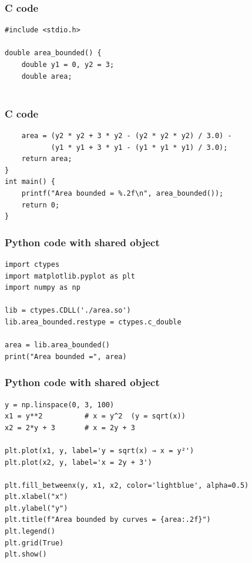 \documentclass{beamer}
\begin{document}
\begin{frame}[fragile]
\frametitle{C code}
\begin{lstlisting}
#include <stdio.h>

double area_bounded() {
    double y1 = 0, y2 = 3;
    double area;


\end{lstlisting}
\end{frame}
\begin{frame}[fragile]
\frametitle{C code}
\begin{lstlisting}
    area = (y2 * y2 + 3 * y2 - (y2 * y2 * y2) / 3.0) -
           (y1 * y1 + 3 * y1 - (y1 * y1 * y1) / 3.0);
    return area;
}
int main() {
    printf("Area bounded = %.2f\n", area_bounded());
    return 0;
}
\end{lstlisting}
\end{frame}
\begin{frame}[fragile]
\frametitle{Python code with shared object}
\begin{lstlisting}
import ctypes
import matplotlib.pyplot as plt
import numpy as np

lib = ctypes.CDLL('./area.so')
lib.area_bounded.restype = ctypes.c_double

area = lib.area_bounded()
print("Area bounded =", area)

\end{lstlisting}
\end{frame}
\begin{frame}[fragile]
\frametitle{Python code with shared object}
\begin{lstlisting}
y = np.linspace(0, 3, 100)
x1 = y**2          # x = y^2  (y = sqrt(x))
x2 = 2*y + 3       # x = 2y + 3

plt.plot(x1, y, label='y = sqrt(x) → x = y²')
plt.plot(x2, y, label='x = 2y + 3')

plt.fill_betweenx(y, x1, x2, color='lightblue', alpha=0.5)
plt.xlabel("x")
plt.ylabel("y")
plt.title(f"Area bounded by curves = {area:.2f}")
plt.legend()
plt.grid(True)
plt.show()
\end{lstlisting}
\end{frame}
\end{document}
